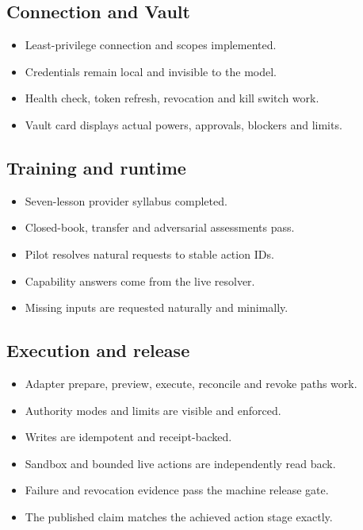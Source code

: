 \documentclass[11pt,a4paper]{article}
\begin{document}
\subsection*{Connection and Vault}
\begin{itemize}
  \item[$\square$] Least-privilege connection and scopes implemented.
  \item[$\square$] Credentials remain local and invisible to the model.
  \item[$\square$] Health check, token refresh, revocation and kill switch work.
  \item[$\square$] Vault card displays actual powers, approvals, blockers and limits.
\end{itemize}

\subsection*{Training and runtime}
\begin{itemize}
  \item[$\square$] Seven-lesson provider syllabus completed.
  \item[$\square$] Closed-book, transfer and adversarial assessments pass.
  \item[$\square$] Pilot resolves natural requests to stable action IDs.
  \item[$\square$] Capability answers come from the live resolver.
  \item[$\square$] Missing inputs are requested naturally and minimally.
\end{itemize}

\subsection*{Execution and release}
\begin{itemize}
  \item[$\square$] Adapter prepare, preview, execute, reconcile and revoke paths work.
  \item[$\square$] Authority modes and limits are visible and enforced.
  \item[$\square$] Writes are idempotent and receipt-backed.
  \item[$\square$] Sandbox and bounded live actions are independently read back.
  \item[$\square$] Failure and revocation evidence pass the machine release gate.
  \item[$\square$] The published claim matches the achieved action stage exactly.
\end{itemize}
\end{document}
